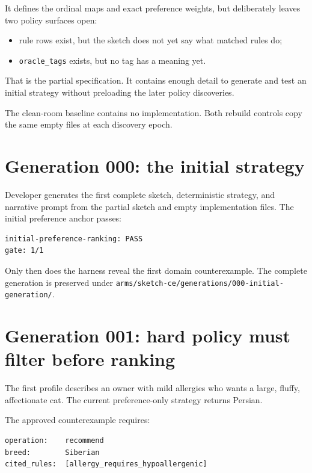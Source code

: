 It defines the ordinal maps and exact preference weights, but deliberately leaves two policy
surfaces open:

\begin{itemize}
\tightlist
\item
  rule rows exist, but the sketch does not yet say what matched rules do;
\item
  \texttt{oracle\_tags} exists, but no tag has a meaning yet.
\end{itemize}

That is the partial specification. It contains enough detail to generate and test an initial
strategy without preloading the later policy discoveries.

The clean-room baseline contains no implementation. Both rebuild controls copy the same empty
files at each discovery epoch.

\section{Generation 000: the initial strategy}\label{generation-000-the-initial-strategy}

Developer generates the first complete sketch, deterministic strategy, and narrative prompt
from the partial sketch and empty implementation files. The initial preference anchor passes:

\begin{verbatim}
initial-preference-ranking: PASS
gate: 1/1
\end{verbatim}

Only then does the harness reveal the first domain counterexample. The complete generation is
preserved under \texttt{arms/sketch-ce/generations/000-initial-generation/}.

\section{Generation 001: hard policy must filter before ranking}\label{generation-001-hard-policy-must-filter-before-ranking}

The first profile describes an owner with mild allergies who wants a large, fluffy,
affectionate cat. The current preference-only strategy returns Persian.

The approved counterexample requires:

\begin{verbatim}
operation:    recommend
breed:        Siberian
cited_rules:  [allergy_requires_hypoallergenic]
\end{verbatim}


